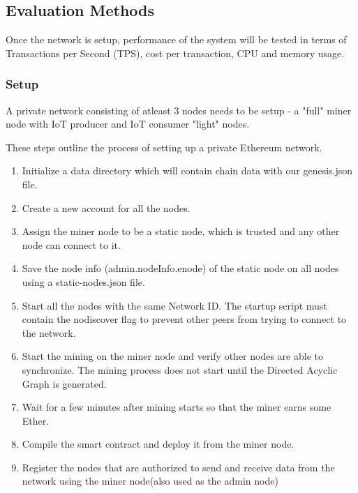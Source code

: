 \documentclass[11pt,openright]{report}
\begin{document}
\subsection{Evaluation Methods}
Once the network is setup, performance of the system will be tested in terms of Transactions per Second (TPS), cost per transaction, CPU and memory usage.

\subsubsection{Setup}
A private network consisting of atleast 3 nodes needs to be setup - a "full" miner node with IoT producer and IoT consumer "light" nodes.

These steps outline the process of setting up a private Ethereum network.
\begin{enumerate}
    \item Initialize a data directory which will contain chain data with our genesis.json file.
    \item Create a new account for all the nodes.
    \item Assign the miner node to be a static node, which is trusted and any other node can connect to it. 
    \item Save the node info (admin.nodeInfo.enode) of the static node on all nodes using a static-nodes.json file.
    \item Start all the nodes with the same Network ID. The startup script must contain the nodiscover flag to prevent other peers from trying to connect to the network.
    \item Start the mining on the miner node and verify other nodes are able to synchronize. The mining process does not start until the Directed Acyclic Graph is generated. 
    \item Wait for a few minutes after mining starts so that the miner earns some Ether. 
    \item Compile the smart contract and deploy it from the miner node.
    \item Register the nodes that are authorized to send and receive data from the network using the miner node(also used as the admin node)
\end{enumerate}
\end{document}
